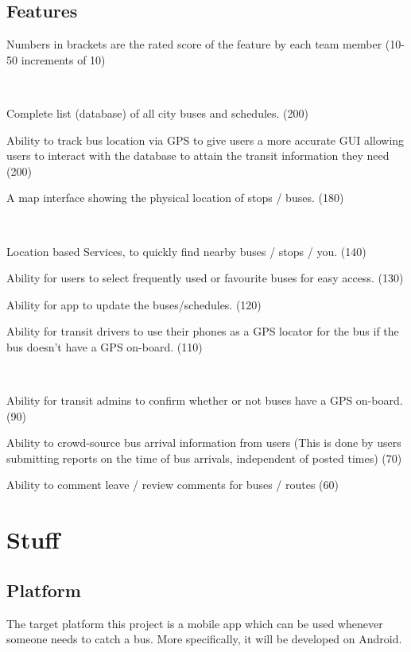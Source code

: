 \documentclass[a4paper,12pt]{article}
\begin{document}
\subsection{Features}
Numbers in brackets are the rated score of the feature by each team member (10-50 increments of 10)
\begin{description}
\item [Must haves] \hfill \
\item Complete list (database) of all city buses and schedules. (200)
\item Ability to track bus location via GPS to give users a more accurate GUI allowing users to interact with the database to attain the transit information they need (200)
\item A map interface showing the physical location of stops / buses. (180)
\item [Should Haves] \hfill \
\item Location based Services, to quickly find nearby buses / stops / you. (140)
\item Ability for users to select frequently used or favourite buses for easy access. (130)
\item Ability for app to update the buses/schedules. (120)
\item Ability for transit drivers to use their phones as a GPS locator for the bus if the bus doesn't have a GPS on-board. (110)
\item [Would Be Nice] \hfill \
\item Ability for transit admins to confirm whether or not buses have a GPS on-board. (90) 
\item Ability to crowd-source bus arrival information from users (This is done by users submitting reports on the time of bus arrivals, independent of posted times) (70)
\item Ability to comment leave / review comments for buses / routes (60)
\end{description}


\pagebreak
\section{Stuff}
\subsection{Platform} 
	The target platform this project is a mobile app which can be used whenever someone needs to catch a bus. More specifically, it will be developed on Android.
\end{document}
